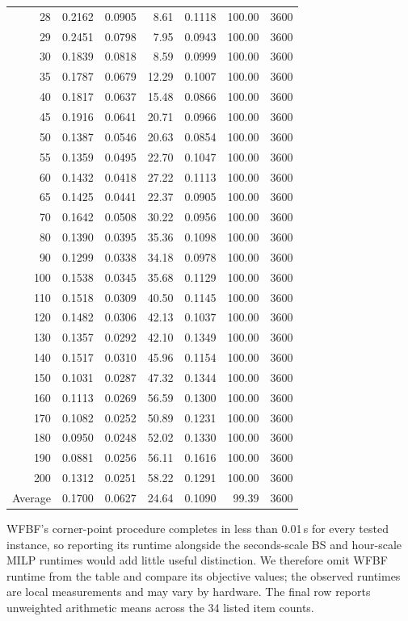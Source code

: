 \begin{table}[htbp]
\begin{tabular}{@{}r@{\quad}r@{\quad}rr@{\quad}rrr@{}}
28  & 0.2162 & 0.0905 & 8.61 & 0.1118 & 100.00 & 3600 \\
29  & 0.2451 & 0.0798 & 7.95 & 0.0943 & 100.00 & 3600 \\
30  & 0.1839 & 0.0818 & 8.59 & 0.0999 & 100.00 & 3600 \\
35  & 0.1787 & 0.0679 & 12.29 & 0.1007 & 100.00 & 3600 \\
40  & 0.1817 & 0.0637 & 15.48 & 0.0866 & 100.00 & 3600 \\
45  & 0.1916 & 0.0641 & 20.71 & 0.0966 & 100.00 & 3600 \\
50  & 0.1387 & 0.0546 & 20.63 & 0.0854 & 100.00 & 3600 \\
55  & 0.1359 & 0.0495 & 22.70 & 0.1047 & 100.00 & 3600 \\
60  & 0.1432 & 0.0418 & 27.22 & 0.1113 & 100.00 & 3600 \\
65  & 0.1425 & 0.0441 & 22.37 & 0.0905 & 100.00 & 3600 \\
70  & 0.1642 & 0.0508 & 30.22 & 0.0956 & 100.00 & 3600 \\
80  & 0.1390 & 0.0395 & 35.36 & 0.1098 & 100.00 & 3600 \\
90  & 0.1299 & 0.0338 & 34.18 & 0.0978 & 100.00 & 3600 \\
100 & 0.1538 & 0.0345 & 35.68 & 0.1129 & 100.00 & 3600 \\
110 & 0.1518 & 0.0309 & 40.50 & 0.1145 & 100.00 & 3600 \\
120 & 0.1482 & 0.0306 & 42.13 & 0.1037 & 100.00 & 3600 \\
130 & 0.1357 & 0.0292 & 42.10 & 0.1349 & 100.00 & 3600 \\
140 & 0.1517 & 0.0310 & 45.96 & 0.1154 & 100.00 & 3600 \\
150 & 0.1031 & 0.0287 & 47.32 & 0.1344 & 100.00 & 3600 \\
160 & 0.1113 & 0.0269 & 56.59 & 0.1300 & 100.00 & 3600 \\
170 & 0.1082 & 0.0252 & 50.89 & 0.1231 & 100.00 & 3600 \\
180 & 0.0950 & 0.0248 & 52.02 & 0.1330 & 100.00 & 3600 \\
190 & 0.0881 & 0.0256 & 56.11 & 0.1616 & 100.00 & 3600 \\
200 & 0.1312 & 0.0251 & 58.22 & 0.1291 & 100.00 & 3600 \\
\hline
Average & 0.1700 & 0.0627 & 24.64 & 0.1090 & 99.39 & 3600 \\
\hline
\end{tabular}
\end{table}

WFBF's corner-point procedure completes in less than 0.01\,s for every
tested instance, so reporting its runtime alongside the seconds-scale BS
and hour-scale MILP runtimes would add little useful distinction. We
therefore omit WFBF runtime from the table and compare its objective values;
the observed runtimes are local measurements and may vary by hardware. The
final row reports unweighted arithmetic means across the 34 listed item
counts.
